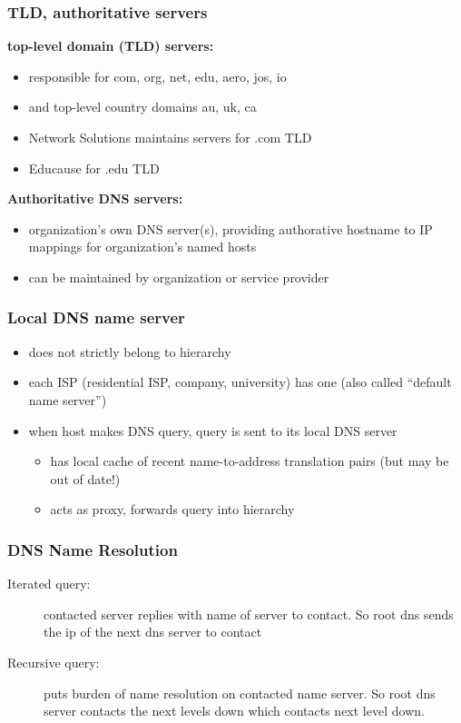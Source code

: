 \subsubsection{TLD, authoritative servers}
\textbf{top-level domain (TLD) servers:}
\begin{itemize}
	\item responsible for com, org, net, edu, aero, jos, io
	\item and top-level country domains au, uk, ca
	\item Network Solutions maintains servers for .com TLD
	\item Educause for .edu TLD
\end{itemize}
\textbf{Authoritative DNS servers:}
\begin{itemize}
	\item organization's own DNS server(s), providing authorative hostname to IP mappings for organization's named hosts
	\item can be maintained by organization or service provider
\end{itemize}
\subsubsection{Local DNS name server}
\begin{itemize}
	\item does not strictly belong to hierarchy
	\item each ISP (residential ISP, company, university) has one (also called ``default name server'')
	\item when host makes DNS query, query is sent to its local DNS server
	\begin{itemize}
		\item has local cache of recent name-to-address translation pairs (but may be out of date!)
		\item acts as proxy, forwards query into hierarchy
	\end{itemize}
\end{itemize}
\subsubsection{DNS Name Resolution}
\begin{description}
	\item[Iterated query:] contacted server replies with name of server to contact. So root dns sends the ip of the next dns server to contact
	\item[Recursive query:] puts burden of name resolution on contacted name server. So root dns server contacts the next levels down which contacts next level down.
\end{description}
